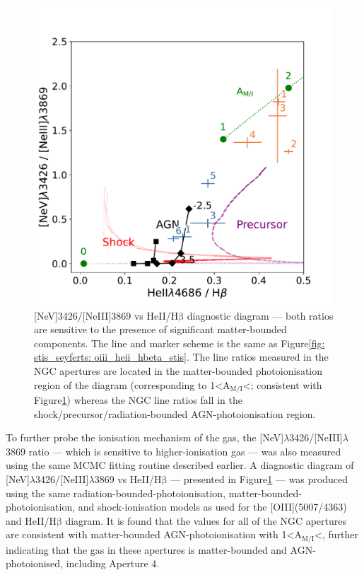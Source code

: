 \begin{figure}[!t]
\centering
    \includegraphics[width=0.8\linewidth]{figures/stis_seyferts/heii_nev_neii.pdf}
    \caption[{[}NeV{]}3426/{[}NeIII{]}3869 vs HeII/H$\mathrm{\beta}$ diagnostic diagram for the warm-ionised gas in NGC and NGC, including modelled values for (radiation-bounded and matter-bounded) photo- and shock-ionised gas.]{[NeV]3426/[NeIII]3869 vs HeII/H$\mathrm{\beta}$ diagnostic diagram --- both ratios are sensitive to the presence of significant matter-bounded components. The line and marker scheme is the same as Figure\;\ref{fig: stis_seyferts: oiii_heii_hbeta_stis}. The line ratios measured in the NGC apertures are located in the matter-bounded photoionisation region of the diagram (corresponding to \mbox{1\;\textless\;A$_\mathrm{M/I}$\;\textless{}}; consistent with Figure\;\ref{fig: stis_seyferts:nev_neiii_heii_hbeta_stis}) whereas the NGC line ratios fall in the shock/precursor/radiation-bounded AGN-photoionisation region.}
    \label{fig: stis_seyferts:nev_neiii_heii_hbeta_stis}
\end{figure}

To further probe the ionisation mechanism of the gas, the [NeV]$\lambda$3426/[NeIII]$\lambda$3869 ratio --- which is sensitive to higher-ionisation gas --- was also measured using the same MCMC fitting routine described earlier. A diagnostic diagram of [NeV]$\lambda$3426/[NeIII]$\lambda$3869 vs HeII/H$\mathrm{\beta}$ --- presented in Figure\;\ref{fig: stis_seyferts:nev_neiii_heii_hbeta_stis} --- was produced using the same radiation-bounded-photoionisation, matter-bounded-photoionisation, and shock-ionisation models as used for the [OIII](5007/4363) and HeII/H$\mathrm{\beta}$ diagram. It is found that the values for all of the NGC apertures are consistent with matter-bounded AGN-photoionisation with  1\;\textless\;A$_\mathrm{M/I}$\;\textless{}, further indicating that the gas in these apertures is matter-bounded and AGN-photoionised, including Aperture 4.

